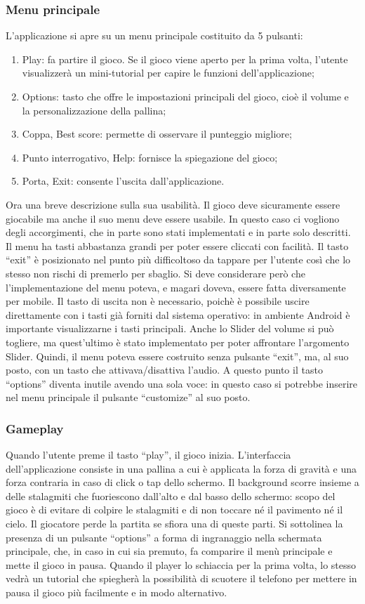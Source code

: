 \subsubsection{Menu principale}
L’applicazione si apre su un menu principale costituito da 5 pulsanti:
\begin{enumerate}
\item Play: fa partire il gioco. Se il gioco viene aperto per la prima volta, l’utente visualizzerà un mini-tutorial per capire le funzioni dell’applicazione;
\item Options: tasto che offre le impostazioni principali del gioco, cioè il volume e la personalizzazione della pallina;
\item Coppa, Best score: permette di osservare il punteggio migliore;
\item Punto interrogativo, Help: fornisce la spiegazione del gioco;
\item Porta, Exit: consente l’uscita dall’applicazione.
\end{enumerate}
Ora una breve descrizione sulla sua usabilità. Il gioco deve sicuramente essere giocabile ma anche il suo menu deve essere usabile. In questo caso ci vogliono degli accorgimenti, che in parte sono stati implementati e in parte solo descritti. 
Il menu ha tasti abbastanza grandi per poter essere cliccati con facilità. Il tasto “exit” è posizionato nel punto più difficoltoso da tappare per l’utente così che lo stesso non rischi di premerlo per sbaglio. Si deve considerare però che l’implementazione del menu poteva, e magari doveva, essere fatta diversamente per mobile. Il tasto di uscita non è necessario, poichè è possibile uscire direttamente con i tasti già forniti dal sistema operativo: in ambiente Android è importante visualizzarne i tasti principali. Anche lo Slider del volume si può togliere, ma quest’ultimo è stato implementato per poter affrontare l’argomento Slider. 
Quindi, il menu poteva essere costruito senza pulsante “exit”, ma, al suo posto, con un tasto che attivava/disattiva l’audio. A questo punto il tasto “options” diventa inutile avendo una sola voce: in questo caso si potrebbe inserire nel menu principale il pulsante “customize” al suo posto.
 
\subsubsection{Gameplay}
Quando l’utente preme il tasto “play”, il gioco inizia. L’interfaccia dell’applicazione consiste in una pallina a cui è applicata la forza di gravità e una forza contraria in caso di click o tap dello schermo. Il background scorre insieme a delle stalagmiti che fuoriescono dall’alto e dal basso dello schermo: scopo del gioco è di evitare di colpire le stalagmiti e di non toccare né il pavimento né il cielo. Il giocatore perde la partita se sfiora una di queste parti.
Si sottolinea la presenza di un pulsante “options” a forma di ingranaggio nella schermata principale, che, in caso in cui sia premuto, fa comparire il menù principale e mette il gioco in pausa. Quando il player lo schiaccia per la prima volta, lo stesso vedrà un tutorial che spiegherà la possibilità di scuotere il telefono per mettere in pausa il gioco più facilmente e in modo alternativo.

